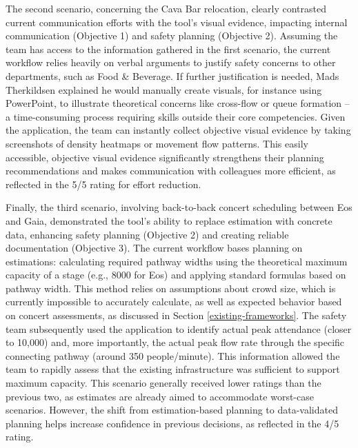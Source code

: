 The second scenario, concerning the Cava Bar relocation, clearly contrasted current communication efforts with the tool's visual evidence, impacting internal communication (Objective 1) and safety planning (Objective 2). Assuming the team has access to the information gathered in the first scenario, the current workflow relies heavily on verbal arguments to justify safety concerns to other departments, such as Food \& Beverage. If further justification is needed, Mads Therkildsen explained he would manually create visuals, for instance using PowerPoint, to illustrate theoretical concerns like cross-flow or queue formation -- a time-consuming process requiring skills outside their core competencies. Given the application, the team can instantly collect objective visual evidence by taking screenshots of density heatmaps or movement flow patterns. This easily accessible, objective visual evidence significantly strengthens their planning recommendations and makes communication with colleagues more efficient, as reflected in the 5/5 rating for effort reduction.

Finally, the third scenario, involving back-to-back concert scheduling between Eos and Gaia, demonstrated the tool's ability to replace estimation with concrete data, enhancing safety planning (Objective 2) and creating reliable documentation (Objective 3). The current workflow bases planning on estimations: calculating required pathway widths using the theoretical maximum capacity of a stage (e.g., 8000 for Eos) and applying standard formulas based on pathway width. This method relies on assumptions about crowd size, which is currently impossible to accurately calculate, as well as expected behavior based on concert assessments, as discussed in Section \ref{existing-frameworks}. The safety team subsequently used the application to identify actual peak attendance (closer to 10,000) and, more importantly, the actual peak flow rate through the specific connecting pathway (around 350 people/minute). This information allowed the team to rapidly assess that the existing infrastructure was sufficient to support maximum capacity. This scenario generally received lower ratings than the previous two, as estimates are already aimed to accommodate worst-case scenarios. However, the shift from estimation-based planning to data-validated planning helps increase confidence in previous decisions, as reflected in the 4/5 rating.

